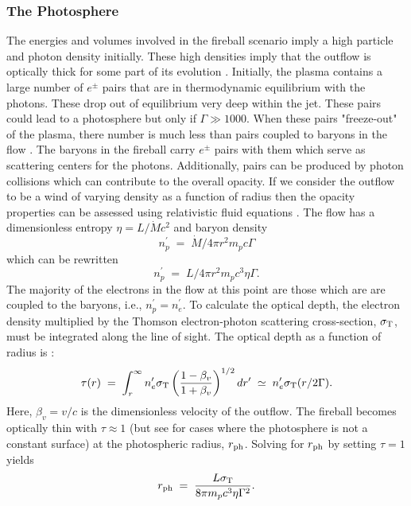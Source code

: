 \subsubsection{The Photosphere}
The energies and volumes involved in the fireball scenario imply a
high particle and photon density initially. These high densities imply
that the outflow is optically thick for some part of its evolution
\cite{Paczynski:1986,Goodman:1986,Shemi:1990}. Initially, the plasma
contains a large number of $e^{\pm}$ pairs that are in thermodynamic
equilibrium with the photons. These drop out of equilibrium very deep
within the jet. These pairs could lead to a photosphere but only if
$\Gamma\gg1000$. When these pairs "freeze-out" of the plasma, there
number is much less than pairs coupled to baryons in the flow
\cite{Goodman:1986}.  The baryons in the fireball carry $e^{\pm}$
pairs with them which serve as scattering centers for the
photons. Additionally, pairs can be produced by photon collisions
which can contribute to the overall opacity. If we consider the
outflow to be a wind of varying density as a function of radius then
the opacity properties can be assessed using relativistic fluid
equations \cite{Paczynski:1990}. The flow has a dimensionless entropy
$\eta=L/\dot{M}c^2$ and baryon density
\begin{equation}
  \label{eq:pdensity}
  n^{\prime}_p\;=\;\dot{M}/4 \pi r^2 m_p c \Gamma 
\end{equation}
which can be rewritten
\begin{equation}
  \label{eq:pdensity2}
   n^{\prime}_p\;=\;L/ 4 \pi r^2 m_p c^3 \eta \Gamma.
\end{equation}
The majority of the electrons in the flow at this point are those
which are are coupled to the baryons, i.e.,
$n^{\prime}_p=n^{\prime}_e$. To calculate the optical depth, the
electron density multiplied by the Thomson electron-photon scattering
cross-section, $\sigma_{\rm T}$, must be integrated along the line of
sight. The optical depth as a function of radius is
\cite{Paczynski:1990}:
\begin{equation}
  \tau(r)\;=\;\int_r^{\infty}n^{\prime}_e \sigma_{\rm T}\left(\frac{1-\beta_v}{1+\beta_v}\right)^{1/2}dr^{\prime}\;\simeq\;n^{\prime}_e \sigma_{\rm T}(r/2 \Gamma).
\end{equation}
Here, $\beta_v=v/c$ is the dimensionless velocity of the outflow. The
fireball becomes optically thin with $\tau\approx1$ (but see
\cite{peer:2008} for cases where the photosphere is not a constant
surface) at the photospheric radius, $r_{\rm ph}$. Solving for $r_{\rm
  ph}$ by setting $\tau=1$ yields
\begin{equation}
  \label{eq:rph}
 r_{\rm ph}\;=\;\frac{ L \sigma_{\rm T}}{8 \pi m_p c^3 \eta \Gamma^2}.
\end{equation}


